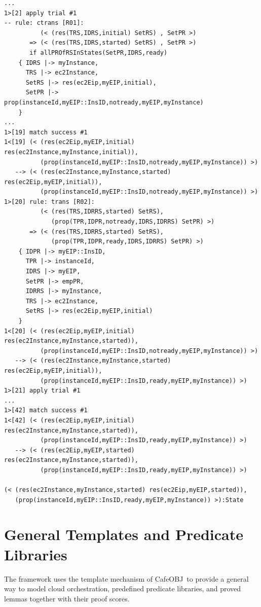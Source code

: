 \documentclass[12pt]{report}
\newcommand{\cafeobj}{{\sf CafeOBJ}~}
\begin{document}
\begin{verbatim}
...
1>[2] apply trial #1
-- rule: ctrans [R01]: 
          (< (res(TRS,IDRS,initial) SetRS) , SetPR >) 
       => (< (res(TRS,IDRS,started) SetRS) , SetPR >)
       if allPROfRSInStates(SetPR,IDRS,ready)
    { IDRS |-> myInstance, 
      TRS |-> ec2Instance, 
      SetRS |-> res(ec2Eip,myEIP,initial), 
      SetPR |-> prop(instanceId,myEIP::InsID,notready,myEIP,myInstance)
    }
...
1>[19] match success #1
1<[19] (< (res(ec2Eip,myEIP,initial) res(ec2Instance,myInstance,initial)),
          (prop(instanceId,myEIP::InsID,notready,myEIP,myInstance)) >)
   --> (< (res(ec2Instance,myInstance,started) res(ec2Eip,myEIP,initial)),
          (prop(instanceId,myEIP::InsID,notready,myEIP,myInstance)) >)
1>[20] rule: trans [R02]:
          (< (res(TRS,IDRRS,started) SetRS),
             (prop(TPR,IDPR,notready,IDRS,IDRRS) SetPR) >)
       => (< (res(TRS,IDRRS,started) SetRS),
             (prop(TPR,IDPR,ready,IDRS,IDRRS) SetPR) >)
    { IDPR |-> myEIP::InsID,
      TPR |-> instanceId,
      IDRS |-> myEIP,
      SetPR |-> empPR,
      IDRRS |-> myInstance,
      TRS |-> ec2Instance,
      SetRS |-> res(ec2Eip,myEIP,initial)
    }
1<[20] (< (res(ec2Eip,myEIP,initial) res(ec2Instance,myInstance,started)),
          (prop(instanceId,myEIP::InsID,notready,myEIP,myInstance)) >)
   --> (< (res(ec2Instance,myInstance,started) res(ec2Eip,myEIP,initial)),
          (prop(instanceId,myEIP::InsID,ready,myEIP,myInstance)) >)
1>[21] apply trial #1
...
1>[42] match success #1
1<[42] (< (res(ec2Eip,myEIP,initial) res(ec2Instance,myInstance,started)),
          (prop(instanceId,myEIP::InsID,ready,myEIP,myInstance)) >)
   --> (< (res(ec2Eip,myEIP,started) res(ec2Instance,myInstance,started)),
          (prop(instanceId,myEIP::InsID,ready,myEIP,myInstance)) >)

(< (res(ec2Instance,myInstance,started) res(ec2Eip,myEIP,started)),
   (prop(instanceId,myEIP::InsID,ready,myEIP,myInstance)) >):State
\end{verbatim}

\chapter{General Templates and Predicate Libraries}
\label{chap:reusable}
The framework uses the template mechanism of \cafeobj to provide a
general way to model cloud orchestration, predefined predicate
libraries, and proved lemmas together with their proof scores.
\end{document}
